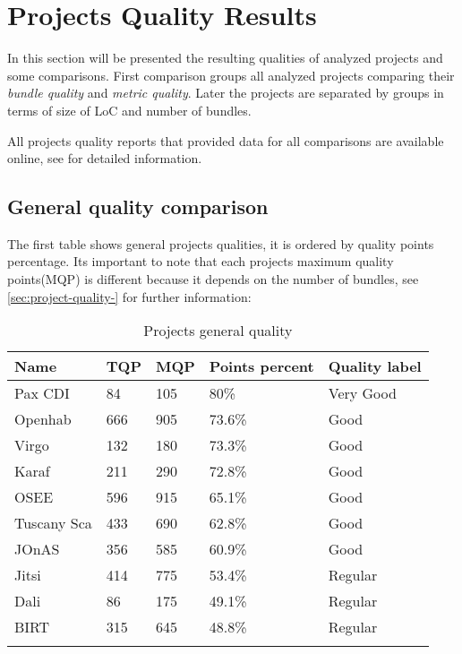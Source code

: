\section{Projects Quality Results}
In this section will be presented the resulting qualities of analyzed projects and some comparisons. First comparison groups all analyzed  projects comparing their \emph{bundle quality} and \emph{metric quality}. Later the projects are separated by groups in terms of size of LoC and number of bundles.

All projects quality reports that provided data for all comparisons are available online, see \cite{intrabundle reports 2014} for detailed information. 

\subsection{General quality comparison}

The first table shows general projects qualities, it is ordered by quality points percentage. Its important to note that each projects maximum quality points(MQP) is different because it depends on the number of bundles, see \ref{sec:project-quality-} for further information:

\begin{table}[h]
\caption{Projects general quality}
\label{projects-general-quality}
    \begin{tabular}{  p{3cm} | p{2cm} | p{2cm} | p{3cm} | p{4cm}}
    \Xhline{2\arrayrulewidth}
    Name & TQP & MQP & Points percent & Quality label \\  \hline
    Pax CDI & 84 & 105 & 80\% & Very Good\\ \hline 
    Openhab & 	666 & 905 & 73.6\% & Good\\ \hline
    Virgo & 132 & 180 & 73.3\% & Good\\ 
    Karaf & 211 & 290 & 72.8\% & Good\\ \hline
    OSEE & 596 & 915 & 65.1\% & Good\\ \hline
    Tuscany Sca & 433 & 690 & 62.8\% & Good\\ \hline
    JOnAS & 356 & 585 & 60.9\%  & Good\\ \hline
    Jitsi & 414 & 775 & 53.4\% & Regular\\ \hline
    Dali & 86 & 175 & 49.1\%  & Regular\\ \hline
    BIRT & 315 & 645 & 48.8\% & Regular\\ \hline
   \Xhline{2\arrayrulewidth}
    \end{tabular}
\end{table}
\FloatBarrier 

